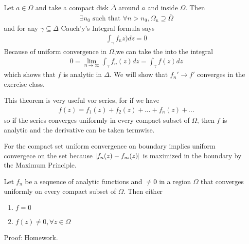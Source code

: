 Let $a \in \Omega$ and take a compact disk $\overline{\Delta}$ around $a$ and inside $\Omega$. Then
\begin{align*}
	\exists n_0 \text{ such that } \forall n > n_0, \Omega_n \supseteq \overline{\Omega}
\end{align*}
and for any $\gamma \subseteq \overline{\Delta}$ Cauch'y's Integral formula says
\begin{align*}
	\int_{\gamma}f_nz) dz = 0
\end{align*}
Because of uniform convergence in $\overline{\Omega}$,we can take the into the integral
\begin{align*}
	0 = \lim_{n \to \infty} \int_{\gamma} f_n(z)dz = \int_{\gamma}f(z) dz
\end{align*}
which shows that $f$ is analytic in $\Delta$. We will show that $f_n' \to f'$ converges in the exercise class.


This theorem is very useful vor series, for if we have
\begin{align*}
	f(z) = f_1(z) + f_2(z) + \ldots + f_n(z) + \ldots
\end{align*}
so if the series converges uniformly in every compact subset of $\Omega$, then $f$ is analytic and the derivative can be taken termwise.


For the compact set uniform convergence on boundary implies uniform convergece on the set because
$
	\vert
		f_n(z) - f_m(z)
	\vert
$
is maximized in the boundary by the Maximum Principle.


\begin{theorem}[Hurwitz]
Let $f_n$ be a sequence of analytic functions and $\neq 0$ in a region $\Omega$ that converges uniformly on every compact subset of $\Omega$. Then either
\begin{enumerate}
	\item $f = 0$
	\item $f(z) \neq 0, \forall z \in \Omega$
\end{enumerate}
\end{theorem}
Proof: Homework. 

